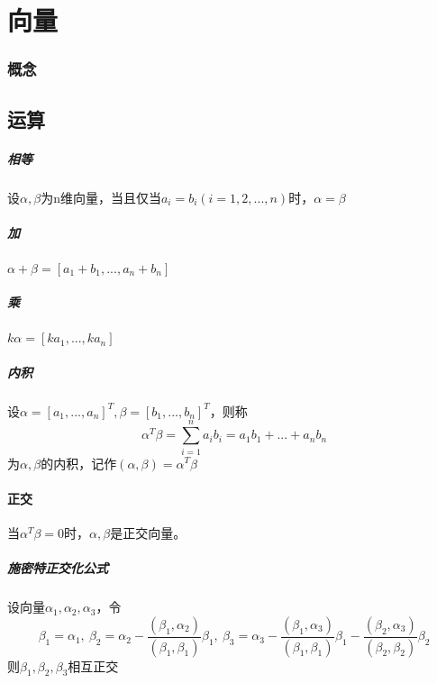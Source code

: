 
\chapter{向量}


\subsection{概念}

\section{运算}

\paragraph{相等}
设\(\alpha,\beta\)为n维向量，当且仅当\(a_i = b_i(i = 1,2,...,n)\)时，\(\alpha = \beta\)


\paragraph{加}
\(\alpha + \beta = [a_1 + b_1, ..., a_n + b_n]\)


\paragraph{乘}
\(k\alpha = [ka_1, ..., ka_n]\)


\paragraph{内积}
设\(\alpha = [a_1, ..., a_n]^T, \beta = [b_1, ..., b_n]^T\)，则称\[\alpha^T\beta = \sum_{i = 1}^{n} a_ib_i = a_1b_1 + ... + a_nb_n\]为\(\alpha, \beta\)的内积，记作\((\alpha, \beta) = \alpha^T\beta\)


\subsubsection{正交}
当\(\alpha^T\beta = 0\)时，\(\alpha, \beta\)是正交向量。

\paragraph{施密特正交化公式}
设向量\(\alpha_1, \alpha_2, \alpha_3\)，令
\[\beta_1 = \alpha_1,\ \beta_2 = \alpha_2 - \dfrac{(\beta_1, \alpha_2)}{(\beta_1, \beta_1)}\beta_1,\ \beta_3 = \alpha_3 - \dfrac{(\beta_1, \alpha_3)}{(\beta_1, \beta_1)}\beta_1 - \dfrac{(\beta_2, \alpha_3)}{(\beta_2, \beta_2)}\beta_2\]
则\(\beta_1, \beta_2, \beta_3\)相互正交


